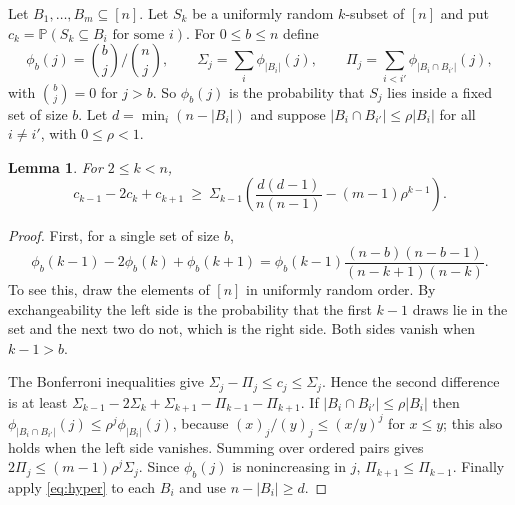 \documentclass[11pt]{article}
\newtheorem{lemma}[theorem]{Lemma}
\theoremstyle{remark}
\newcommand{\PP}{\mathbb P}
\begin{document}
Let $B_1,\dots,B_m\subseteq[n]$. Let $S_k$ be a uniformly random $k$-subset of $[n]$ and put $c_k=\PP(S_k\subseteq B_i\text{ for some }i)$. For $0\le b\le n$ define
\[
 \phi_b(j)=\binom bj\Big/\binom nj,\qquad \Sigma_j=\sum_i\phi_{|B_i|}(j),\qquad
 \Pi_j=\sum_{i<i'}\phi_{|B_i\cap B_{i'}|}(j),
\]
with $\binom bj=0$ for $j>b$. So $\phi_b(j)$ is the probability that $S_j$ lies inside a fixed set of size $b$. Let $d=\min_i(n-|B_i|)$ and suppose $|B_i\cap B_{i'}|\le \rho|B_i|$ for all $i\ne i'$, with $0\le\rho<1$.
\begin{lemma}\label{lem:tail}
For $2\le k<n$,
\[
 c_{k-1}-2c_k+c_{k+1}\ \ge\ \Sigma_{k-1}
 \left(\frac{d(d-1)}{n(n-1)}-(m-1)\rho^{k-1}\right).
\]
\end{lemma}
\begin{proof}
First, for a single set of size $b$,
\begin{equation}
 \phi_b(k-1)-2\phi_b(k)+\phi_b(k+1)
 =\phi_b(k-1)\frac{(n-b)(n-b-1)}{(n-k+1)(n-k)} .
 \label{eq:hyper}
\end{equation}
To see this, draw the elements of $[n]$ in uniformly random order. By exchangeability the left side is the probability that the first $k-1$ draws lie in the set and the next two do not, which is the right side. Both sides vanish when $k-1>b$.

The Bonferroni inequalities give $\Sigma_j-\Pi_j\le c_j\le \Sigma_j$. Hence the second difference is at least $\Sigma_{k-1}-2\Sigma_k+\Sigma_{k+1}-\Pi_{k-1}-\Pi_{k+1}$. If $|B_i\cap B_{i'}|\le\rho|B_i|$ then $\phi_{|B_i\cap B_{i'}|}(j)\le\rho^j\phi_{|B_i|}(j)$, because $(x)_j/(y)_j\le(x/y)^j$ for $x\le y$; this also holds when the left side vanishes. Summing over ordered pairs gives $2\Pi_j\le(m-1)\rho^j\Sigma_j$. Since $\phi_b(j)$ is nonincreasing in $j$, $\Pi_{k+1}\le \Pi_{k-1}$. Finally apply \eqref{eq:hyper} to each $B_i$ and use $n-|B_i|\ge d$.
\end{proof}
\end{document}
